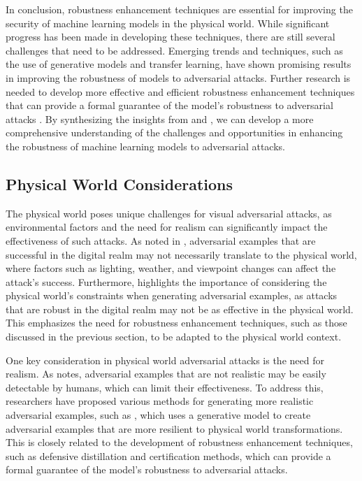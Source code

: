 \documentclass[11pt,a4paper]{article}
\begin{document}
In conclusion, robustness enhancement techniques are essential for improving the security of machine learning models in the physical world. While significant progress has been made in developing these techniques, there are still several challenges that need to be addressed. Emerging trends and techniques, such as the use of generative models and transfer learning, have shown promising results in improving the robustness of models to adversarial attacks. Further research is needed to develop more effective and efficient robustness enhancement techniques that can provide a formal guarantee of the model's robustness to adversarial attacks \cite{doi:10.1109/sp46215.2023.10179316}. By synthesizing the insights from \cite{doi:10.1109/access.2022.3208131} and \cite{doi:10.1007/s10462-024-10841-z}, we can develop a more comprehensive understanding of the challenges and opportunities in enhancing the robustness of machine learning models to adversarial attacks.


\subsection{Physical World Considerations}


The physical world poses unique challenges for visual adversarial attacks, as environmental factors and the need for realism can significantly impact the effectiveness of such attacks. As noted in \cite{doi:10.24963/ijcai.2021/694}, adversarial examples that are successful in the digital realm may not necessarily translate to the physical world, where factors such as lighting, weather, and viewpoint changes can affect the attack's success. Furthermore, \cite{arxiv:1707.08945} highlights the importance of considering the physical world's constraints when generating adversarial examples, as attacks that are robust in the digital realm may not be as effective in the physical world. This emphasizes the need for robustness enhancement techniques, such as those discussed in the previous section, to be adapted to the physical world context.

One key consideration in physical world adversarial attacks is the need for realism. As \cite{doi:10.1109/cvpr42600.2020.00108} notes, adversarial examples that are not realistic may be easily detectable by humans, which can limit their effectiveness. To address this, researchers have proposed various methods for generating more realistic adversarial examples, such as \cite{doi:10.1109/cvpr42600.2020.01426}, which uses a generative model to create adversarial examples that are more resilient to physical world transformations. This is closely related to the development of robustness enhancement techniques, such as defensive distillation and certification methods, which can provide a formal guarantee of the model's robustness to adversarial attacks.
\end{document}
